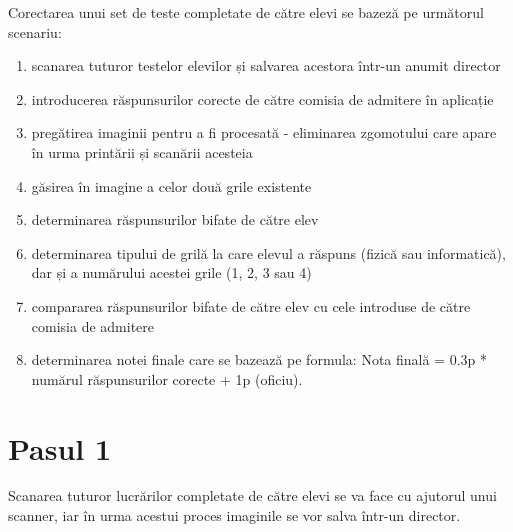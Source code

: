 \documentclass[a4paper,12pt]{report}
\newcommand\tab[1][1cm]{\hspace*{#1}}
\begin{document}
\tab Corectarea unui set de teste completate de către elevi se bazeză pe următorul scenariu:
	\begin{enumerate}
	\setlength\itemsep{1pt}
	\item scanarea tuturor testelor elevilor și salvarea acestora într-un anumit director
	\item introducerea răspunsurilor corecte de către comisia de admitere în aplicație
	\item pregătirea imaginii pentru a fi procesată - eliminarea zgomotului care apare în urma printării și scanării acesteia
	\item găsirea în imagine a celor două grile existente
	\item determinarea răspunsurilor bifate de către elev 
	\item determinarea tipului de grilă la care elevul a răspuns (fizică sau informatică), dar și a numărului acestei grile (1, 2, 3 sau 4)
	\item compararea răspunsurilor bifate de către elev cu cele introduse de către comisia de admitere
	\item determinarea notei finale care se bazează pe formula: Nota finală = 0.3p *  numărul răspunsurilor corecte + 1p (oficiu). 
	\end{enumerate}

\section{Pasul 1}
\tab Scanarea tuturor lucrărilor completate de către elevi se va face cu ajutorul unui scanner, iar în urma acestui proces imaginile se vor salva într-un director.
 
\end{document}
